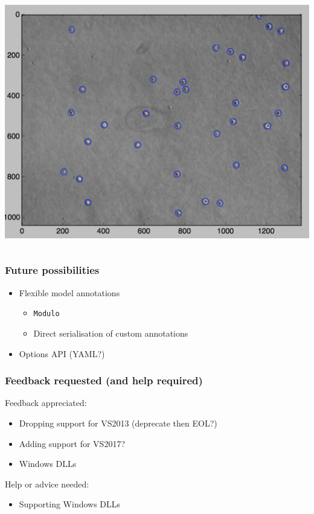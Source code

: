 \documentclass{beamer}
\begin{document}
\begin{frame}[fragile]
\begin{columns}
\begin{column}{0.4\textwidth}
      \includegraphics[width=\textwidth]{figures/overlay.png}
    \end{column}
  \end{columns}
\end{frame}

\begin{frame}[fragile]
  \frametitle{Future possibilities}

  \begin{itemize}
  \item Flexible model annotations
    \begin{itemize}
    \item \texttt{Modulo}
    \item Direct serialisation of custom annotations
    \end{itemize}
    \pause
  \item Options API (YAML?)
  \end{itemize}
\end{frame}

\begin{frame}[fragile]
  \frametitle{Feedback requested (and help required)}

  Feedback appreciated:
  \begin{itemize}
  \item Dropping support for VS2013 (deprecate then EOL?)
  \item Adding support for VS2017?
  \item Windows DLLs
  \end{itemize}
  \pause
  \bigskip
  Help or advice needed:
  \begin{itemize}
  \item Supporting Windows DLLs
  \end{itemize}
\end{frame}
\end{document}
